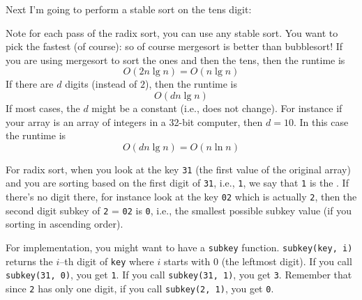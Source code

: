 Next I'm going to perform a stable sort on the tens digit:

Note for each pass of the radix sort, you can use any stable sort.
You want to pick the fastest (of course): so of course mergesort is better than bubblesort!
If you are using mergesort to sort the ones and then the tens, then the
runtime is
\[
  O(2 n \lg n) = O(n \lg n)
\]
If there are $d$ digits (instead of $2$), then the runtime is
\[
  O(d n \lg n)
\]
If most cases, the $d$ might be a constant (i.e., does not change).
For instance if your array is an array of integers in a 32-bit
computer, then $d = 10$.
In this case the runtime is
\[
  O(d n \lg n) = O(n \ln n)
\]

For radix sort, when you look at the key \verb!31! (the first value of the
original array) and you are sorting based on the first digit of \verb!31!,
i.e., \verb!1!, we say that \verb!1! is the .
If there's no digit there, for instance look at the key \verb!02! which is
actually \verb!2!, then the second digit subkey of \verb!2! = \verb!02! is
\verb!0!, i.e., the smallest possible subkey value (if you sorting in
ascending order). 

For implementation, you might want to have a \verb!subkey! function.
\verb!subkey(key, i)! returns the $i$--th digit of \verb!key! where
$i$ starts with $0$ (the leftmost digit).
If you call \verb!subkey(31, 0)!, you get \verb!1!.
If you call \verb!subkey(31, 1)!, you get \verb!3!.
Remember that since \verb!2! has only one digit,
if you call \verb!subkey(2, 1)!, you get \verb!0!.

